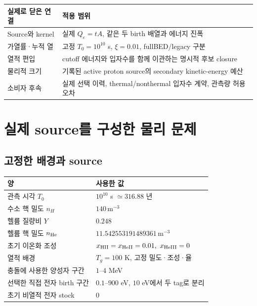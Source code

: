 \documentclass[11pt,a4paper]{article}
\newcommand{\units}[1]{\,\mathrm{#1}}
\begin{document}
\begin{center}
\begin{tabular}{P{.24\linewidth}P{.65\linewidth}}
\toprule
실제로 닫은 연결 & 적용 범위\\
\midrule
Source와 kernel & 실제 \(Q_e=tA\), 같은 두 birth 배열과 에너지 진폭\\
가열률·누적 열 & 고정 \(T_0=10^{10}\) s, \(\xi=0.01\), fullBED/legacy 구분\\
열적 편입 & cutoff 에너지와 입자수를 함께 이관하는 명시적 후보 closure\\
물리적 크기 & 기록된 active proton source의 secondary kinetic-energy 예산\\
소비자 후속 & 실제 선택 이력, thermal/nonthermal 입자수 계약, 관측량 허용오차\\
\bottomrule
\end{tabular}
\end{center}

\section{실제 source를 구성한 물리 문제}

\subsection{고정한 배경과 source}

\begin{center}
\begin{tabular}{P{.39\linewidth}P{.50\linewidth}}
\toprule
양 & 사용한 값\\
\midrule
관측 시각 \(T_0\) & \(10^{10}\) s \(\simeq316.88\) 년\\
수소 핵 밀도 \(n_H\) & \(140\units{m^{-3}}\)\\
헬륨 질량비 \(Y\) & \(0.248\)\\
헬륨 핵 밀도 \(n_{\rm He}\) & \(11.542553191489361\units{m^{-3}}\)\\
초기 이온화 조성 & \(x_{\rm HII}=x_{\rm HeII}=0.01,\ x_{\rm HeIII}=0\)\\
열적 배경 & \(T_g=100\) K, 고정 밀도·조성·율\\
충돌에 사용한 양성자 구간 & \(1\)--\(4\) MeV\\
선택한 직접 전자 birth 구간 & \(0.1\)--\(900\) eV, \(10\) eV에서 두 tag로 분리\\
초기 비열적 전자 stock & 0\\
\bottomrule
\end{tabular}
\end{center}
\end{document}
